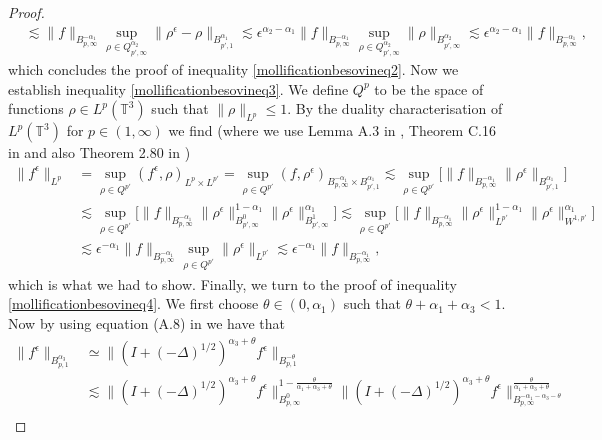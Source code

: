 \documentclass[12pt,a4paper]{article}
\theoremstyle{definition}
\theoremstyle{remark}
\numberwithin{equation}{section}
\begin{document}
\begin{appendices}
\begin{proof}
\begin{align*}
&\lesssim \lVert f \rVert_{B^{-\alpha_1}_{p,\infty}} \sup_{\rho \in Q^{\alpha_2}_{p',\infty}} \lVert \rho^\epsilon - \rho \rVert_{B^{\alpha_1}_{p',1}} \lesssim \epsilon^{\alpha_2 - \alpha_1} \lVert f \rVert_{B^{-\alpha_1}_{p,\infty}} \sup_{\rho \in Q^{\alpha_2}_{p',\infty}} \lVert \rho \rVert_{B^{\alpha_2}_{p',\infty}} \lesssim \epsilon^{\alpha_2 - \alpha_1} \lVert f \rVert_{B^{-\alpha_1}_{p,\infty}},
\end{align*}
which concludes the proof of inequality \eqref{mollificationbesovineq2}. Now we establish inequality \eqref{mollificationbesovineq3}. We define $Q^p$ to be the space of functions $\rho \in L^p (\mathbb{T}^3)$ such that $\lVert \rho \rVert_{L^p} \leq 1$. By the duality characterisation of $L^p (\mathbb{T}^3)$ for $p \in (1,\infty)$ we find (where we use Lemma A.3 in \cite{boutrosnonuniqueness}, Theorem C.16 in \cite{leoni} and also Theorem 2.80 in \cite{bahouri})
\begin{align*}
\lVert f^\epsilon \rVert_{L^p} &= \sup_{\rho \in Q^{p'}} (f^\epsilon, \rho)_{L^p \times L^{p'}} = \sup_{\rho \in Q^{p'}} (f, \rho^\epsilon)_{B^{-\alpha_1}_{p,\infty} \times B^{\alpha_1}_{p',1}} \lesssim \sup_{\rho \in Q^{p'}} \big[ \lVert f \rVert_{B^{-\alpha_1}_{p,\infty}} \lVert \rho^\epsilon \rVert_{B^{\alpha_1}_{p',1}} \big] \\
&\lesssim \sup_{\rho \in Q^{p'}} \big[ \lVert f \rVert_{B^{-\alpha_1}_{p,\infty}} \lVert \rho^\epsilon \rVert_{B^0_{p',\infty}}^{1-\alpha_1} \lVert \rho^\epsilon \rVert_{B^1_{p',\infty}}^{\alpha_1} \big] \lesssim \sup_{\rho \in Q^{p'}} \big[ \lVert f \rVert_{B^{-\alpha_1}_{p,\infty}} \lVert \rho^\epsilon \rVert_{L^{p'}}^{1-\alpha_1} \lVert \rho^\epsilon \rVert_{W^{1,p'}}^{\alpha_1} \big] \\
&\lesssim \epsilon^{-\alpha_1} \lVert f \rVert_{B^{-\alpha_1}_{p,\infty}} \sup_{\rho \in Q^{p'}} \lVert \rho^\epsilon \rVert_{L^{p'}} \lesssim \epsilon^{-\alpha_1} \lVert f \rVert_{B^{-\alpha_1}_{p,\infty}},
\end{align*}
which is what we had to show. Finally, we turn to the proof of inequality \eqref{mollificationbesovineq4}. We first choose $\theta \in (0, \alpha_1)$ such that $\theta + \alpha_1 + \alpha_3 < 1$. Now by using equation (A.8) in \cite{boutrosfractional} we have that
\begin{align*}
\lVert f^\epsilon \rVert_{B^{\alpha_3}_{p,1}} &\simeq \lVert (I + (- \Delta)^{1/2})^{\alpha_3 + \theta} f^\epsilon \rVert_{B^{-\theta}_{p,1}} \\
&\lesssim \lVert (I + (- \Delta)^{1/2})^{\alpha_3 + \theta} f^\epsilon \rVert_{B^0_{p,\infty}}^{1 - \frac{\theta}{\alpha_1+\alpha_3+\theta}} \lVert (I + (- \Delta)^{1/2})^{\alpha_3 + \theta} f^\epsilon \rVert_{B^{-\alpha_1-\alpha_3-\theta}_{p,\infty}}^{\frac{\theta}{\alpha_1+\alpha_3+\theta}} \\

\end{align*}
\end{proof}
\end{appendices}
\end{document}
